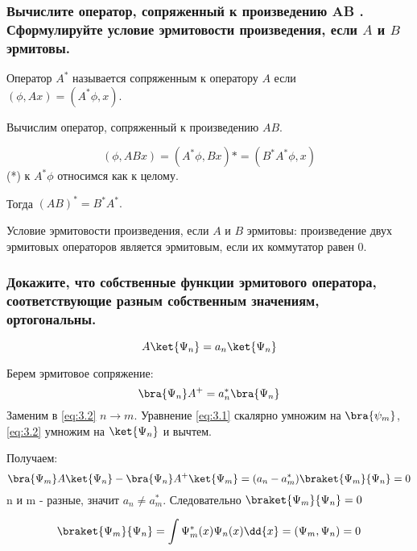 \subsubsection{Вычислите оператор, сопряженный к произведению AB . Сформулируйте условие эрмитовости произведения, если $A$ и $B$ эрмитовы.}



Оператор $A^*$ называется сопряженным к оператору $A$ если $(\phi, Ax)=(A^*\phi,x).$

Вычислим оператор, сопряженный к произведению $AB$.

$$(\phi, ABx)= (A^*\phi,Bx)*=(B^*A^*\phi,x) $$
(*) к $A^*\phi$  относимся как к целому.

Тогда $(AB)^*=B^*A^*.$

Условие эрмитовости произведения, если $A$ и  $B$ эрмитовы:
произведение двух эрмитовых операторов является эрмитовым, если их коммутатор равен 0.

\subsubsection{Докажите, что собственные функции эрмитового оператора, соответствующие разным собственным значениям, ортогональны.}


\begin{equation}
\label{eq:3.1}
A\ket{\Psi_n}=a_n\ket{\Psi_n} 	
\end{equation}

Берем эрмитовое сопряжение:
\begin{equation}
	\label{eq:3.2}
\bra{\Psi_n}A^+=a_n^*\bra{\Psi_n} 
\end{equation}
Заменим в \eqref{eq:3.2} $n\rightarrow m$. Уравнение \eqref{eq:3.1} скалярно умножим на $\bra{\psi_m}$, \eqref{eq:3.2} умножим на $\ket{\Psi_n}$  и вычтем.

Получаем:
\begin{equation}
	\bra{\Psi_m}A\ket{\Psi_n}-\bra{\Psi_n}A^+\ket{\Psi_m}=(a_n-a^*_m)
	\braket{\Psi_m}{\Psi_n}=0
\end{equation}
n и m - разные, значит $a_n\neq a_m^*$. Следовательно $\braket{\Psi_m}{\Psi_n}=0$

$$\big \braket{\Psi_m}{\Psi_n}=\int \Psi_m^*(x)\Psi_n(x)\dd{x}=(\Psi_m,\Psi_n)=0 $$